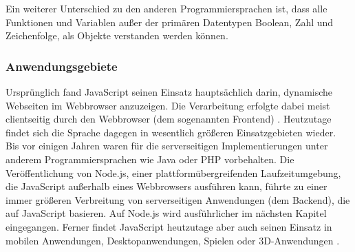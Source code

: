 \noindent
Ein weiterer Unterschied zu den anderen Programmiersprachen ist, dass alle Funktionen und Variablen außer der primären Datentypen Boolean, Zahl und Zeichenfolge, als Objekte verstanden werden können.

\subsubsection{Anwendungsgebiete}
Ursprünglich fand JavaScript seinen Einsatz hauptsächlich darin, dynamische Webseiten im Web\-browser anzuzeigen. Die Verarbeitung erfolgte dabei meist clientseitig durch den Webbrowser (dem sogenannten Frontend) \cite{JS1.3}.
\newline
\noindent
Heutzutage findet sich die Sprache dagegen in wesentlich größeren Einsatzgebieten wieder. 
Bis vor einigen Jahren waren für die serverseitigen Implementierungen unter anderem Programmiersprachen wie Java oder PHP vorbehalten. Die Veröffentlichung von Node.js, einer plattformübergreifenden Laufzeitumgebung, die JavaScript außerhalb eines Webbrowsers ausführen kann, führte zu einer immer größeren Verbreitung von serverseitigen Anwendungen (dem Backend), die auf JavaScript basieren. Auf Node.js wird ausführlicher im nächsten Kapitel eingegangen. 
Ferner findet JavaScript heutzutage aber auch seinen Einsatz in mobilen Anwendungen, Desktopanwendungen, Spielen oder 3D-Anwendungen \cite{JS1.4}.

